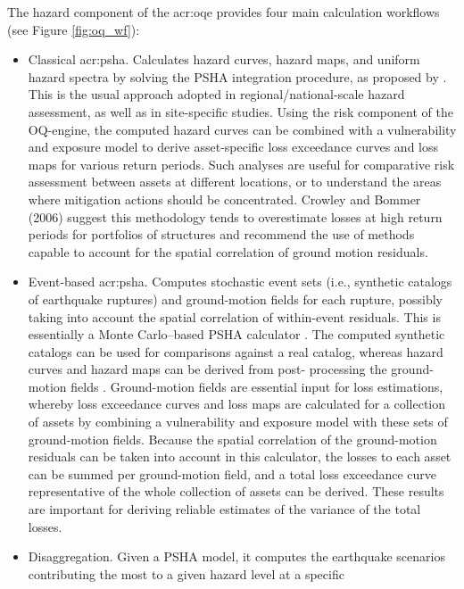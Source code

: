 The hazard component of the \gls{acr:oqe} provides four main calculation 
workflows (see Figure \ref{fig:oq_wf}):
\begin{itemize}
\item Classical \gls{acr:psha}. Calculates hazard curves, hazard maps, 
    and uniform hazard spectra by solving the PSHA integration procedure, 
    as proposed by \textcite{field2003}. 
    This is the usual approach adopted in regional/national-scale hazard 
    assessment, as well as in site-specific studies. Using the risk 
    component of the OQ-engine, the computed hazard curves can be 
    combined with a vulnerability and exposure model to derive 
    asset-specific loss exceedance curves and loss maps for various 
    return periods. Such analyses are useful for comparative risk 
    assessment between assets at different locations, or to understand
    the areas where mitigation actions should be concentrated. 
    Crowley and Bommer (2006) suggest this methodology tends to 
    overestimate losses at high return periods for portfolios of 
    structures and recommend the use of methods capable to account 
    for the spatial correlation of ground motion residuals.
\item Event-based \gls{acr:psha}. Computes stochastic event sets (i.e., 
    synthetic catalogs of earthquake ruptures) and ground-motion fields 
    for each rupture, possibly taking into account the spatial 
    correlation of within-event residuals. This is essentially a 
    Monte Carlo–based PSHA calculator \parencite{musson2000}. The computed 
    synthetic catalogs can be used for comparisons against a real 
    catalog, whereas hazard curves and hazard maps can be derived from 
    post- processing the ground-motion fields \parencite{ebel1999}. 
    Ground-motion fields are essential input for loss estimations, 
    whereby loss exceedance curves and loss maps are calculated for 
    a collection of assets by combining a vulnerability and exposure
    model with these sets of ground-motion fields. Because the spatial
    correlation of the ground-motion residuals can be taken into account
    in this calculator, the losses to each asset can be summed per 
    ground-motion field, and a total loss exceedance curve representative 
    of the whole collection of assets can be derived. These results are 
    important for deriving reliable estimates of the variance of the
    total losses.
\item Disaggregation. Given a PSHA model, it computes the earthquake
    scenarios contributing the most to a given hazard level at a specific

\end{itemize}
